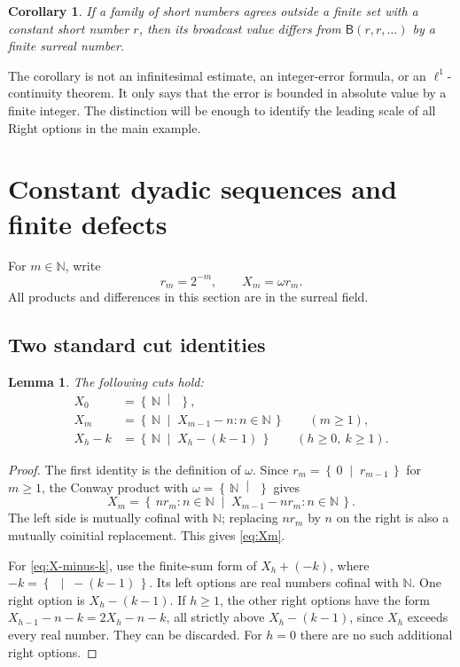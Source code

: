 \documentclass[11pt,letterpaper]{article}
\newtheorem{lemma}[theorem]{Lemma}
\newtheorem{corollary}[theorem]{Corollary}
\theoremstyle{definition}
\theoremstyle{remark}
\newcommand{\NN}{\mathbb N}
\newcommand{\BB}{\mathsf B}
\newcommand{\cut}[2]{\left\{\,#1\;\middle|\;#2\,\right\}}
\begin{document}
\begin{corollary}\label{cor:cofinite}
If a family of short numbers agrees outside a finite set with a constant short
number $r$, then its broadcast value differs from $\BB(r,r,\ldots)$ by a finite
surreal number.
\end{corollary}

The corollary is not an infinitesimal estimate, an integer-error formula, or an
$\ell^1$-continuity theorem. It only says that the error is bounded in absolute
value by a finite integer. The distinction will be enough to identify the
leading scale of all Right options in the main example.

\section{Constant dyadic sequences and finite defects}\label{sec:constants}

For $m\in\NN$, write
\begin{equation}\label{eq:r-X}
                         r_m=2^{-m},\qquad X_m=\omega r_m.
\end{equation}
All products and differences in this section are in the surreal field.

\subsection{Two standard cut identities}

\begin{lemma}\label{lem:X-cuts}
The following cuts hold:
\begin{align}
 X_0&=\cut{\NN}{},\label{eq:X0}\\
 X_m&=\cut{\NN}{X_{m-1}-n:n\in\NN}\qquad(m\geq1),\label{eq:Xm}\\
 X_h-k&=\cut{\NN}{X_h-(k-1)}\qquad(h\geq0,\ k\geq1).
 \label{eq:X-minus-k}
\end{align}
\end{lemma}
\begin{proof}
The first identity is the definition of $\omega$. Since
$r_m=\cut{0}{r_{m-1}}$ for $m\geq1$, the Conway product with
$\omega=\cut{\NN}{}$ gives
\[
 X_m=\cut{nr_m:n\in\NN}{X_{m-1}-nr_m:n\in\NN}.
\]
The left side is mutually cofinal with $\NN$; replacing $nr_m$ by $n$ on the
right is also a mutually coinitial replacement. This gives \eqref{eq:Xm}.

For \eqref{eq:X-minus-k}, use the finite-sum form of $X_h+(-k)$, where
$-k=\cut{} {-(k-1)}$. Its left options are real numbers cofinal with $\NN$.
One right option is $X_h-(k-1)$. If $h\geq1$, the other right options have the
form $X_{h-1}-n-k=2X_h-n-k$, all strictly above $X_h-(k-1)$, since $X_h$
exceeds every real number. They can be discarded. For $h=0$ there are no such
additional right options.
\end{proof}
\end{document}
